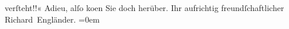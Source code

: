 \begin{ledgroupsized}[t]{13cm}
{                        verſteht!!}«\pend
           \pstart
           Adieu, alſo ko{\geminationm}en Sie doch herüber.\pend
           \pstart
           Ihr aufrichtig freundſchaftlicher{\\[\baselineskip]}\spacefill\mbox{Richard Engländer.}\pend
           \leftskip=0em{}\endnumbering{}\end{ledgroupsized}  \newcommand{\dateiname}{L00468}\newcommand{\titel}{Peter Altenberg an Arthur Schnitzler, [30. 7. 1895]}\newcommand{\editorInnen}{Martin Anton Müller und Gerd-Hermann Susen}
      